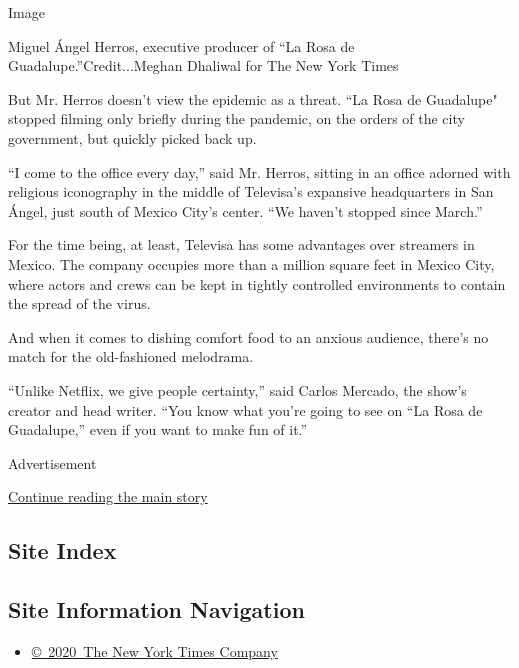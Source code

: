 Image

Miguel Ángel Herros, executive producer of ``La Rosa de
Guadalupe.''Credit...Meghan Dhaliwal for The New York Times

But Mr. Herros doesn't view the epidemic as a threat. ``La Rosa de
Guadalupe" stopped filming only briefly during the pandemic, on the
orders of the city government, but quickly picked back up.

``I come to the office every day,'' said Mr. Herros, sitting in an
office adorned with religious iconography in the middle of Televisa's
expansive headquarters in San Ángel, just south of Mexico City's center.
``We haven't stopped since March.''

For the time being, at least, Televisa has some advantages over
streamers in Mexico. The company occupies more than a million square
feet in Mexico City, where actors and crews can be kept in tightly
controlled environments to contain the spread of the virus.

And when it comes to dishing comfort food to an anxious audience,
there's no match for the old-fashioned melodrama.

``Unlike Netflix, we give people certainty,'' said Carlos Mercado, the
show's creator and head writer. ``You know what you're going to see on
``La Rosa de Guadalupe,'' even if you want to make fun of it.''

Advertisement

\protect\hyperlink{after-bottom}{Continue reading the main story}

\hypertarget{site-index}{%
\subsection{Site Index}\label{site-index}}

\hypertarget{site-information-navigation}{%
\subsection{Site Information
Navigation}\label{site-information-navigation}}

\begin{itemize}
\tightlist
\item
  \href{https://help.nytimes3xbfgragh.onion/hc/en-us/articles/115014792127-Copyright-notice}{©~2020~The
  New York Times Company}
\end{itemize}

